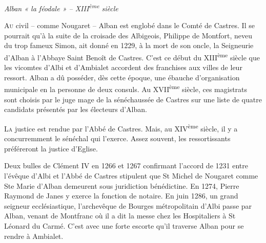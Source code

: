 \begin{center}
  {\Large\itshape Alban « la féodale » -- XIII\textsuperscript{ème} siècle}
\end{center}

\vspace{1.5em}

\noindent
\lettrine{A}{u} civil -- comme Nougaret -- Alban est englobé dans le Comté
de Castres. Il se pourrait qu'à la suite de la croisade des Albigeois,
Philippe de Montfort, neveu du trop fameux Simon, ait donné en 1229,
à la mort de son oncle, la Seigneurie d'Alban à l'Abbaye Saint Benoît
de Castres. C'est ce début du XIII\textsuperscript{ème} siècle que les
vicomtes d'Albi et d'Ambialet accordent des franchises aux villes de
leur ressort. Alban a dû posséder, dès cette époque, une ébauche
d'organisation municipale en la personne de deux consuls. Au
XVII\textsuperscript{ème} siècle, ces magistrats sont choisis par le juge
mage de la sénéchaussée de Castres sur une liste de quatre candidats
présentés par les électeurs d'Alban.

\vspace{0.8em}

\noindent
\lettrine{L}{a} justice est rendue par l'Abbé de Castres. Mais, au
XIV\textsuperscript{ème} siècle, il y a concurremment le sénéchal qui
l'exerce. Assez souvent, les ressortissants préféreront la justice
d'Eglise.

\vspace{0.8em}

\noindent
Deux bulles de Clément IV en 1266 et 1267 confirmant l'accord de 1231
entre l'évêque d'Albi et l'Abbé de Castres stipulent que St Michel de
Nougaret comme Ste Marie d'Alban demeurent sous juridiction
bénédictine. En 1274, Pierre Raymond de Janes y exerce la fonction
de notaire. En juin 1286, un grand seigneur ecclésiastique,
l'archevêque de Bourges métropolitain d'Albi passe par Alban, venant
de Montfranc où il a dit la messe chez les Hospitaliers à St Léonard
du Carmé. C'est avec une forte escorte qu'il traverse Alban pour se
rendre à Ambialet.

